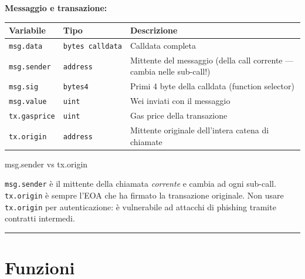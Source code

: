 \documentclass[
  italian,
  openany]{book}
\newcounter{none} %
\begin{document}
\textbf{Messaggio e transazione:}

{\def\LTcaptype{none} %
\begin{longtable}[]{@{}
  >{\raggedright\arraybackslash}p{}
  >{\raggedright\arraybackslash}p{}
  >{\raggedright\arraybackslash}p{}@{}}
\toprule\noalign{}
\begin{minipage}[b]{\linewidth}\raggedright
Variabile
\end{minipage} & \begin{minipage}[b]{\linewidth}\raggedright
Tipo
\end{minipage} & \begin{minipage}[b]{\linewidth}\raggedright
Descrizione
\end{minipage} \\
\midrule\noalign{}
\endhead
\bottomrule\noalign{}
\endlastfoot
\texttt{msg.data} & \texttt{bytes\ calldata} & Calldata completa \\
\texttt{msg.sender} & \texttt{address} & Mittente del messaggio (della
call corrente --- cambia nelle sub-call!) \\
\texttt{msg.sig} & \texttt{bytes4} & Primi 4 byte della calldata
(function selector) \\
\texttt{msg.value} & \texttt{uint} & Wei inviati con il messaggio \\
\texttt{tx.gasprice} & \texttt{uint} & Gas price della transazione \\
\texttt{tx.origin} & \texttt{address} & Mittente originale dell'intera
catena di chiamate \\
\end{longtable}
}

\begin{calloutwarning}{msg.sender vs tx.origin}

\texttt{msg.sender} è il mittente della chiamata \emph{corrente} e
cambia ad ogni sub-call. \texttt{tx.origin} è sempre l'EOA che ha
firmato la transazione originale. Non usare \texttt{tx.origin} per
autenticazione: è vulnerabile ad attacchi di phishing tramite contratti
intermedi.

\end{calloutwarning}

\begin{center}\rule{0.5\linewidth}{0.5pt}\end{center}

\section{Funzioni}\label{funzioni}
\end{document}
